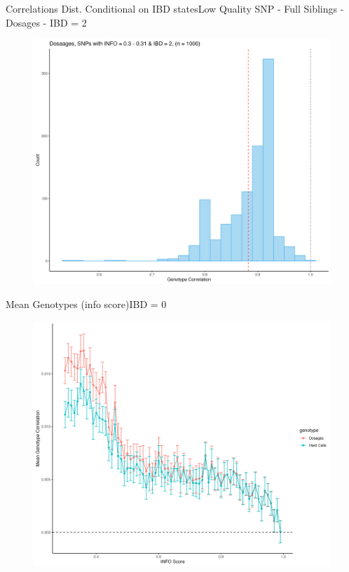 \documentclass{beamer}
\begin{document}




\begin{frame}{Correlations Dist. Conditional on IBD states}{Low Quality SNP - Full Siblings - Dosages - IBD = 2}

\begin{figure}

      \includegraphics[width= .85\textwidth]{fig/DS-2-i30.png}
      
\end{figure}

\end{frame}




\begin{frame}{Mean Genotypes (info score)}{IBD = 0}

      \begin{figure}

            \includegraphics[width= .85\textwidth]{fig/mean_gt_by_ibd_0.png}
            
      \end{figure}

\end{frame}
\end{document}
